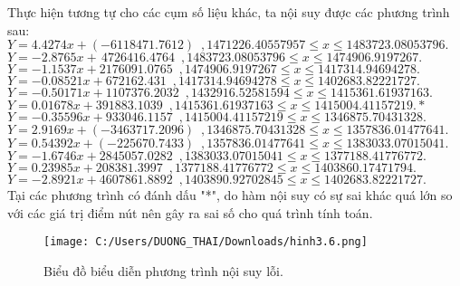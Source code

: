 \documentclass[14pt,a4paper]{article}
\begin{document}
\begin{itemize}
     \hspace*{30pt}Thực hiện tương tự cho các cụm số liệu khác, ta nội suy được các phương trình sau:\vspace{6pt}\\
    ${\displaystyle Y=4.4274x+(-6118471.7612)\,\,\,, 1471226.40557957 \leq x \leq 1483723.08053796.}$\vspace{6pt}\\
    ${\displaystyle Y=-2.8765x+\,4726416.4764\,\,\,, 1483723.08053796 \leq x \leq 1474906.9197267.}$\vspace{6pt}\\
    ${\displaystyle Y=-1.1537x+2176091.0765\,\,\,, 1474906.9197267 \leq x \leq 1417314.94694278. }$\vspace{6pt}\\
    ${\displaystyle Y=-0.08521x+672162.431 \,\,\,, 1417314.94694278 \leq x \leq 1402683.82221727.}$ \vspace{6pt}\\
    ${\displaystyle Y=-0.50171x+1107376.2032\,\,\,,  1432916.52581594 \leq x\leq 1415361.61937163.}$\vspace{6pt}\\
    ${\displaystyle Y=0.01678x+391883.1039\,\,\,,  1415361.61937163 \leq x\leq 1415004.41157219.*}$\vspace{6pt}\\
    ${\displaystyle Y=-0.35596x+933046.1157\,\,\,, 1415004.41157219 \leq x\leq 1346875.70431328.}$\vspace{6pt}\\
    ${\displaystyle Y=2.9169x+(-3463717.2096)\,\,\,, 1346875.70431328 \leq x\leq 1357836.01477641.}$\vspace{6pt}\\
    ${\displaystyle Y=0.54392x+(-225670.7433)\,\,\,, 1357836.01477641 \leq x\leq 1383033.07015041.}$\vspace{6pt}\\
    ${\displaystyle Y=-1.6746x+2845057.0282\,\,\,, 1383033.07015041 \leq x\leq 1377188.41776772.}$\vspace{6pt}\\
    ${\displaystyle Y=0.23985x+208381.3997\,\,\,, 1377188.41776772 \leq x\leq 1403860.17471794.}$\vspace{6pt}\\
    ${\displaystyle Y=-2.8921x+4607861.8892\,\,\,, 1403890.92702845 \leq x\leq 1402683.82221727.}$\vspace{6pt}\\
    \hspace*{30pt}Tại các phương trình có đánh dấu "*", do hàm nội suy có sự sai khác quá lớn so với các giá trị điểm nút nên gây ra sai số cho quá trình tính toán.\vspace{6pt}\\
     \begin{figure}[H]
    	\centering
    	\texttt{[image: C:/Users/DUONG\_THAI/Downloads/hinh3.6.png]}
    	\caption[Biểu đồ biểu diễn phương trình nội suy lỗi.]{Biểu đồ biểu diễn phương trình nội suy lỗi.}
    	\label{hinh36}
    \end{figure} \vspace{6pt} 
\end{itemize}
\newpage
\end{document}
